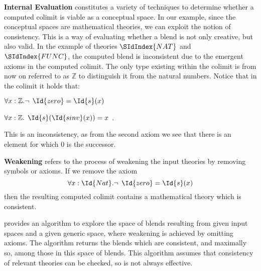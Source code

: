 {\bf Internal Evaluation} constitutes a variety of techniques to determine whether a computed colimit is viable as a conceptual space. In our example, since the conceptual spaces are mathematical theories, we can exploit the notion of consistency. This is a way of evaluating whether a
blend is not only creative, but also valid. In the example of theories
$\SIdIndex{NAT}$ and $\SIdIndex{FUNC}$,
the computed blend is inconsistent due to the emergent axioms in the
computed colimit. The only type existing within the colimit is from now
on referred to as $\mathbb{Z}$ to distinguish it from the natural
numbers. Notice that in the colimit it holds that:
\begin{center}
  $\forall x: \mathbb{Z}. \neg \:\:   \Id{zero} = \Id{s}(x)$
\end{center}
\begin{center}
  $\forall x: \mathbb{Z}. \:\: \Id{s}(\Id{sinv}(x)) = x$ \:.
\end{center}
This is an inconsistency, as from the second axiom we see 
that there is an
element for which 0 is the successor.

{\bf Weakening} refers to the process of weakening the input
theories by removing symbols or axioms. If we remove the axiom 
$$
\forall x: \Id{Nat}. \neg \:\: \Id{zero} = \Id{s}(x)
$$
then the resulting computed colimit contains a mathematical theory
which is consistent.  

\textcite{MartinezEtAl14} provides an algorithm to explore the space
of blends resulting from given input spaces and a given generic space, where
weakening is achieved by omitting axioms.  The algorithm returns the
blends which are consistent, and maximally so, among those in this
space of blends.  This algorithm assumes that consistency of relevant
theories can be checked, so is not always effective.

